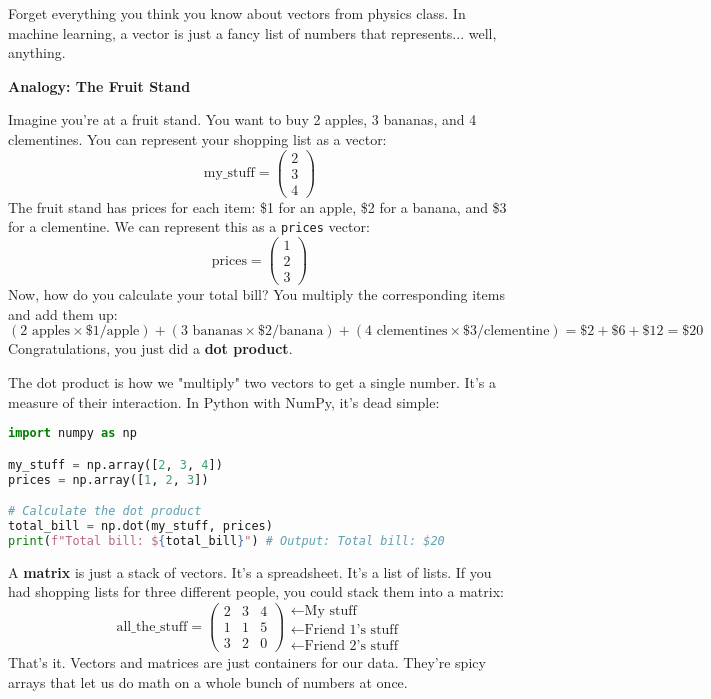 \documentclass[11pt, letterpaper, openany]{book}
\begin{document}
Forget everything you think you know about vectors from physics class. In machine learning, a vector is just a fancy list of numbers that represents... well, anything.

\textbf{Analogy: The Fruit Stand}

Imagine you're at a fruit stand. You want to buy 2 apples, 3 bananas, and 4 clementines. You can represent your shopping list as a vector:
\[ \text{my\_stuff} = \begin{pmatrix} 2 \\ 3 \\ 4 \end{pmatrix} \]
The fruit stand has prices for each item: \$1 for an apple, \$2 for a banana, and \$3 for a clementine. We can represent this as a \texttt{prices} vector:
\[ \text{prices} = \begin{pmatrix} 1 \\ 2 \\ 3 \end{pmatrix} \]
Now, how do you calculate your total bill? You multiply the corresponding items and add them up:
\[ (2 \text{ apples} \times \$1/\text{apple}) + (3 \text{ bananas} \times \$2/\text{banana}) + (4 \text{ clementines} \times \$3/\text{clementine}) = \$2 + \$6 + \$12 = \$20 \]
Congratulations, you just did a \textbf{dot product}.

The dot product is how we "multiply" two vectors to get a single number. It's a measure of their interaction. In Python with NumPy, it's dead simple:

\begin{lstlisting}[language=Python]
import numpy as np

my_stuff = np.array([2, 3, 4])
prices = np.array([1, 2, 3])

# Calculate the dot product
total_bill = np.dot(my_stuff, prices)
print(f"Total bill: ${total_bill}") # Output: Total bill: $20
\end{lstlisting}

A \textbf{matrix} is just a stack of vectors. It's a spreadsheet. It's a list of lists. If you had shopping lists for three different people, you could stack them into a matrix:
\[ \text{all\_the\_stuff} = \begin{pmatrix} 2 & 3 & 4 \\ 1 & 1 & 5 \\ 3 & 2 & 0 \end{pmatrix} \begin{matrix} \leftarrow \text{My stuff} \\ \leftarrow \text{Friend 1's stuff} \\ \leftarrow \text{Friend 2's stuff} \end{matrix} \]
That's it. Vectors and matrices are just containers for our data. They're spicy arrays that let us do math on a whole bunch of numbers at once.
\end{document}
